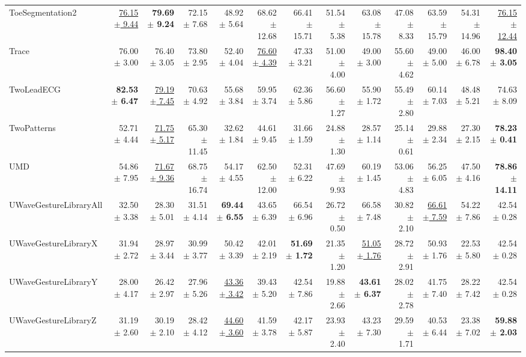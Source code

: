 \begin{landscape}
\begin{longtable}{lrrrrrrrrrrrr}
ToeSegmentation2 & \underline{76.15 $\pm$ 9.44} & \textbf{79.69 $\pm$ 9.24} & 72.15 $\pm$ 7.68 & 48.92 $\pm$ 5.64 & 68.62 $\pm$ 12.68 & 66.41 $\pm$ 15.71 & 51.54 $\pm$ 5.38 & 63.08 $\pm$ 15.78 & 47.08 $\pm$ 8.33 & 63.59 $\pm$ 15.79 & 54.31 $\pm$ 14.96 & \underline{76.15 $\pm$ 12.44} \\
Trace & 76.00 $\pm$ 3.00 & 76.40 $\pm$ 3.05 & 73.80 $\pm$ 2.95 & 52.40 $\pm$ 4.04 & \underline{76.60 $\pm$ 4.39} & 47.33 $\pm$ 3.21 & 51.00 $\pm$ 4.00 & 49.00 $\pm$ 3.00 & 55.60 $\pm$ 4.62 & 49.00 $\pm$ 5.00 & 46.00 $\pm$ 6.78 & \textbf{98.40 $\pm$ 3.05} \\
TwoLeadECG & \textbf{82.53 $\pm$ 6.47} & \underline{79.19 $\pm$ 7.45} & 70.63 $\pm$ 4.92 & 55.68 $\pm$ 3.84 & 59.95 $\pm$ 3.74 & 62.36 $\pm$ 5.86 & 56.60 $\pm$ 1.27 & 55.90 $\pm$ 1.72 & 55.49 $\pm$ 2.80 & 60.14 $\pm$ 7.03 & 48.48 $\pm$ 5.21 & 74.63 $\pm$ 8.09 \\
TwoPatterns & 52.71 $\pm$ 4.44 & \underline{71.75 $\pm$ 5.17} & 65.30 $\pm$ 11.45 & 32.62 $\pm$ 1.84 & 44.61 $\pm$ 9.45 & 31.66 $\pm$ 1.59 & 24.88 $\pm$ 1.30 & 28.57 $\pm$ 1.14 & 25.14 $\pm$ 0.61 & 29.88 $\pm$ 2.34 & 27.30 $\pm$ 2.15 & \textbf{78.23 $\pm$ 0.41} \\
UMD & 54.86 $\pm$ 7.95 & \underline{71.67 $\pm$ 9.36} & 68.75 $\pm$ 16.74 & 54.17 $\pm$ 4.55 & 62.50 $\pm$ 12.00 & 52.31 $\pm$ 6.22 & 47.69 $\pm$ 9.93 & 60.19 $\pm$ 1.45 & 53.06 $\pm$ 4.83 & 56.25 $\pm$ 6.05 & 47.50 $\pm$ 4.16 & \textbf{78.86 $\pm$ 14.11} \\
UWaveGestureLibraryAll & 32.50 $\pm$ 3.38 & 28.30 $\pm$ 5.01 & 31.51 $\pm$ 4.14 & \textbf{69.44 $\pm$ 6.55} & 43.65 $\pm$ 6.39 & 66.54 $\pm$ 6.96 & 26.72 $\pm$ 0.50 & 66.58 $\pm$ 7.48 & 30.82 $\pm$ 2.10 & \underline{66.61 $\pm$ 7.59} & 54.22 $\pm$ 7.86 & 42.54 $\pm$ 0.28 \\
UWaveGestureLibraryX & 31.94 $\pm$ 2.72 & 28.97 $\pm$ 3.44 & 30.99 $\pm$ 3.77 & 50.42 $\pm$ 3.39 & 42.01 $\pm$ 2.19 & \textbf{51.69 $\pm$ 1.72} & 21.35 $\pm$ 1.20 & \underline{51.05 $\pm$ 1.76} & 28.72 $\pm$ 2.91 & 50.93 $\pm$ 1.76 & 22.53 $\pm$ 5.80 & 42.54 $\pm$ 0.28 \\
UWaveGestureLibraryY & 28.00 $\pm$ 4.17 & 26.42 $\pm$ 2.97 & 27.96 $\pm$ 5.26 & \underline{43.36 $\pm$ 3.42} & 39.43 $\pm$ 5.20 & 42.54 $\pm$ 7.86 & 19.88 $\pm$ 2.66 & \textbf{43.61 $\pm$ 6.37} & 28.02 $\pm$ 2.78 & 41.75 $\pm$ 7.40 & 28.22 $\pm$ 7.42 & 42.54 $\pm$ 0.28 \\
UWaveGestureLibraryZ & 31.19 $\pm$ 2.60 & 30.19 $\pm$ 2.10 & 28.42 $\pm$ 4.12 & \underline{44.60 $\pm$ 3.60} & 41.59 $\pm$ 3.78 & 42.17 $\pm$ 5.87 & 23.93 $\pm$ 2.40 & 43.23 $\pm$ 7.30 & 29.59 $\pm$ 1.71 & 40.53 $\pm$ 6.44 & 23.38 $\pm$ 7.02 & \textbf{59.88 $\pm$ 2.03} \\

\end{longtable}
\end{landscape}
